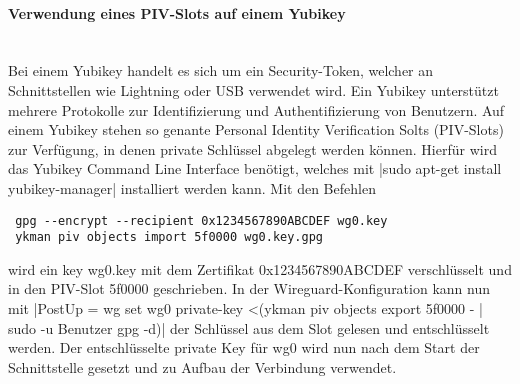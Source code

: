 \paragraph{Verwendung eines PIV-Slots auf einem Yubikey}
\noindent \\Bei einem Yubikey handelt es sich um ein Security-Token, welcher an Schnittstellen wie Lightning oder USB verwendet wird. Ein Yubikey unterst\"utzt mehrere Protokolle zur Identifizierung und Authentifizierung von Benutzern. Auf einem Yubikey stehen so genante Personal Identity Verification Solts (PIV-Slots) zur Verf\"ugung, in denen private Schl\"ussel abgelegt werden k\"onnen. Hierf\"ur wird das Yubikey Command Line Interface ben\"otigt, welches mit |sudo apt-get install yubikey-manager| installiert werden kann. Mit den Befehlen 
\begin{verbatim}
 gpg --encrypt --recipient 0x1234567890ABCDEF wg0.key
 ykman piv objects import 5f0000 wg0.key.gpg
\end{verbatim}
wird ein key wg0.key mit dem Zertifikat 0x1234567890ABCDEF verschl\"usselt und in den PIV-Slot 5f0000 geschrieben. In der Wireguard-Konfiguration kann nun mit |PostUp = wg set wg0 private-key <(ykman piv objects export 5f0000 - | sudo -u Benutzer gpg -d)| der Schl\"ussel aus dem Slot gelesen und entschl\"usselt werden. Der entschl\"usselte private Key für wg0 wird nun nach dem Start der Schnittstelle gesetzt  und zu Aufbau der Verbindung verwendet. 






  
